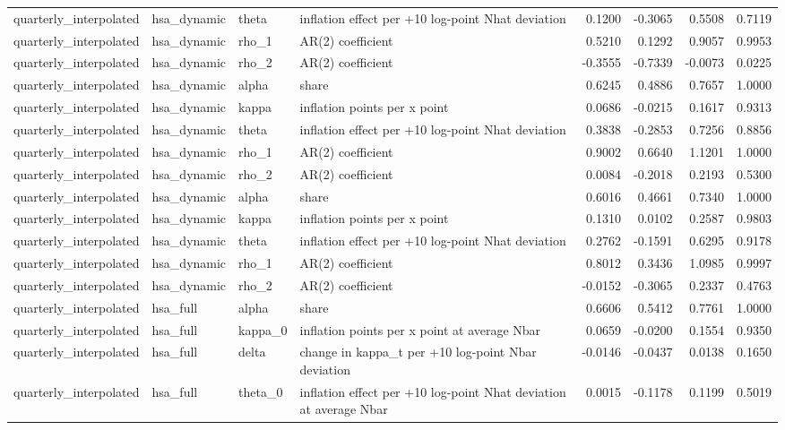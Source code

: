 \begin{tabular}{llllrrrr}
quarterly\_interpolated & hsa\_dynamic & theta & inflation effect per +10 log-point Nhat deviation & 0.1200 & -0.3065 & 0.5508 & 0.7119 \\
quarterly\_interpolated & hsa\_dynamic & rho\_1 & AR(2) coefficient & 0.5210 & 0.1292 & 0.9057 & 0.9953 \\
quarterly\_interpolated & hsa\_dynamic & rho\_2 & AR(2) coefficient & -0.3555 & -0.7339 & -0.0073 & 0.0225 \\
quarterly\_interpolated & hsa\_dynamic & alpha & share & 0.6245 & 0.4886 & 0.7657 & 1.0000 \\
quarterly\_interpolated & hsa\_dynamic & kappa & inflation points per x point & 0.0686 & -0.0215 & 0.1617 & 0.9313 \\
quarterly\_interpolated & hsa\_dynamic & theta & inflation effect per +10 log-point Nhat deviation & 0.3838 & -0.2853 & 0.7256 & 0.8856 \\
quarterly\_interpolated & hsa\_dynamic & rho\_1 & AR(2) coefficient & 0.9002 & 0.6640 & 1.1201 & 1.0000 \\
quarterly\_interpolated & hsa\_dynamic & rho\_2 & AR(2) coefficient & 0.0084 & -0.2018 & 0.2193 & 0.5300 \\
quarterly\_interpolated & hsa\_dynamic & alpha & share & 0.6016 & 0.4661 & 0.7340 & 1.0000 \\
quarterly\_interpolated & hsa\_dynamic & kappa & inflation points per x point & 0.1310 & 0.0102 & 0.2587 & 0.9803 \\
quarterly\_interpolated & hsa\_dynamic & theta & inflation effect per +10 log-point Nhat deviation & 0.2762 & -0.1591 & 0.6295 & 0.9178 \\
quarterly\_interpolated & hsa\_dynamic & rho\_1 & AR(2) coefficient & 0.8012 & 0.3436 & 1.0985 & 0.9997 \\
quarterly\_interpolated & hsa\_dynamic & rho\_2 & AR(2) coefficient & -0.0152 & -0.3065 & 0.2337 & 0.4763 \\
quarterly\_interpolated & hsa\_full & alpha & share & 0.6606 & 0.5412 & 0.7761 & 1.0000 \\
quarterly\_interpolated & hsa\_full & kappa\_0 & inflation points per x point at average Nbar & 0.0659 & -0.0200 & 0.1554 & 0.9350 \\
quarterly\_interpolated & hsa\_full & delta & change in kappa\_t per +10 log-point Nbar deviation & -0.0146 & -0.0437 & 0.0138 & 0.1650 \\
quarterly\_interpolated & hsa\_full & theta\_0 & inflation effect per +10 log-point Nhat deviation at average Nbar & 0.0015 & -0.1178 & 0.1199 & 0.5019 \\

\end{tabular}
